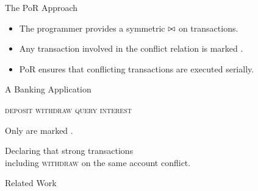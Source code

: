 \begin{frame}{The PoR Approach}

  \begin{itemize}
    \setlength{\itemsep}{8pt}
    \item The programmer provides a symmetric  $\bowtie$
          on transactions.
    \item Any transaction involved in the conflict relation is marked
          .
    \item PoR ensures that conflicting transactions are executed serially.
  \end{itemize}
\end{frame}

\begin{frame}{A Banking Application}
  \begin{center}
    \textsc{deposit \quad withdraw \quad query \quad interest}

    \vspace{0.50cm}
    Only  are marked .

    Declaring that strong transactions \\[3pt]
    including \textsc{withdraw} on the same account conflict.
  \end{center}
\end{frame}

\begin{frame}{Related Work}
  \begin{center}
  \end{center}


  \vspace{0.30cm}

\end{frame}

